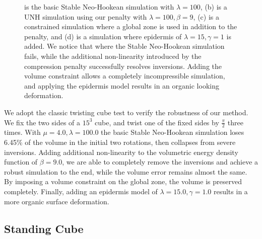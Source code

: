 \begin{figure}[ht]
{		is the basic Stable Neo-Hookean simulation with $\lambda = 100$, (b) is a UNH simulation
		using our penalty with $\lambda = 100, \beta = 9$, (c) is a constrained simulation where a
		global zone is used in addition to the penalty, and (d) is a simulation where epidermis of
		$\lambda = 15, \gamma = 1$ is added. We notice that where the Stable Neo-Hookean simulation
		fails, while the additional non-linearity introduced by the compression penalty successfully
		resolves inversions. Adding the volume constraint allows a completely incompressible
		simulation, and applying the epidermis model results in an organic looking deformation.}
	\label{fig:twist}
\end{figure} 

We adopt the classic twisting cube test to verify the robustness of our method. We fix the two sides
of a $15^3$ cube, and twist one of the fixed sides by $\frac{\pi}{2}$ three times. With $\mu = 4.0,
\lambda = 100.0$ the basic Stable Neo-Hookean simulation loses 6.45\% of the volume in the
initial two rotations, then collapses from severe inversions. Adding additional non-linearity to the volumetric energy density function of $\beta = 9.0$, we are able to completely remove the inversions and achieve a robust simulation to the end, while the volume error remains almost the same. By imposing a volume constraint on the global zone, the volume is preserved completely. Finally, adding an epidermis model of $\lambda = 15.0, \gamma = 1.0$ results in a more organic surface deformation.

\subsection{Standing Cube}

